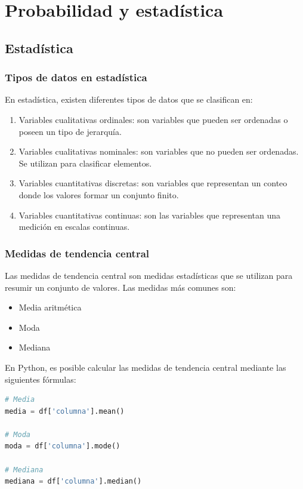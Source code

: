 \documentclass[a4paper, 12pt]{book}
\begin{document}
\section{Probabilidad y estadística}
\subsection{Estadística}
\subsubsection{Tipos de datos en estadística}
En estadística, existen diferentes tipos de datos que se clasifican en:
\begin{enumerate}
	\item Variables cualitativas ordinales: son variables que pueden ser ordenadas o poseen un tipo de jerarquía.
	\item Variables cualitativas nominales: son variables que no pueden ser ordenadas. Se utilizan para clasificar elementos.
	\item Variables cuantitativas discretas: son variables que representan un conteo donde los valores formar un conjunto finito.
	\item Variables cuantitativas continuas: son las variables que representan una medición en escalas continuas.
\end{enumerate}

\subsubsection{Medidas de tendencia central}
Las medidas de tendencia central son medidas estadísticas que se utilizan para resumir un conjunto de valores. Las medidas más comunes son:

\begin{itemize}
	\item Media aritmética
	\item Moda
	\item Mediana
\end{itemize}

En Python, es posible calcular las medidas de tendencia central mediante las siguientes fórmulas:
\begin{lstlisting}[language=Python]
# Media
media = df['columna'].mean()

# Moda
moda = df['columna'].mode()

# Mediana
mediana = df['columna'].median()
\end{lstlisting}
\end{document}
